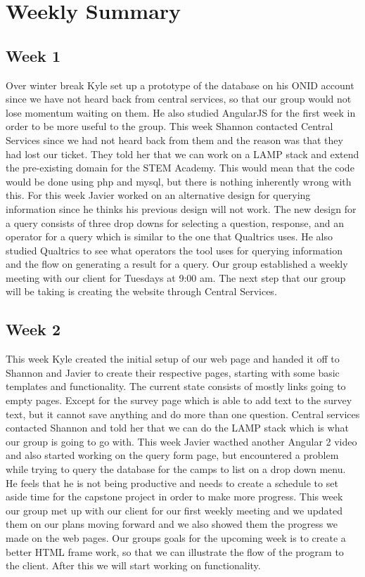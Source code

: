 \documentclass[letterpaper,10pt,serif, draftclsnofoot,onecolumn, compsoc, titlepage]{IEEEtran}
\begin{document}
\section{Weekly Summary}
\subsection{Week 1}
Over winter break Kyle set up a prototype of the database on his ONID account since we have not heard back from central services, so that our group would not lose momentum waiting on them. He also studied AngularJS for the first week in order to be more useful to the group. This week Shannon contacted Central Services since we had not heard back from them and the reason was that they had lost our ticket. They told her that we can work on a LAMP stack and extend the pre-existing domain for the STEM Academy. This would mean that the code would be done using php and mysql, but there is nothing inherently wrong with this. For this week Javier worked on an alternative design for querying information since he thinks his previous design will not work. The new design for a query consists of three drop downs for selecting a question, response, and an operator for a query which is similar to the one that Qualtrics uses. He also studied Qualtrics to see what operators the tool uses for querying information and the flow on generating a result for a query. Our group established a weekly meeting with our client for Tuesdays at 9:00 am. The next step that our group will be taking is creating the website through Central Services. 

\subsection{Week 2}
This week Kyle created the initial setup of our web page and handed it off to Shannon and Javier to create their respective pages, starting with some basic templates and functionality. The current state consists of mostly links going to empty pages. Except for the survey page which is able to add text to the survey text, but it cannot save anything and do more than one question. Central services contacted Shannon and told her that we can do the LAMP stack which is what our group is going to go with. This week Javier wacthed another Angular 2 video and also started working on the query form page, but encountered a problem while trying to query the database for the camps to list on a drop down menu. He feels that he is not being productive and needs to create a schedule to set aside time for the capstone project in order to make more progress. This week our group met up with our client  for our first weekly meeting and we updated them on our plans moving forward and we also showed them the progress we made on the web pages. Our groups goals for the upcoming week is to create a better HTML frame work, so that we can illustrate the flow of the program to the client. After this we will start working on functionality. 
\end{document}
